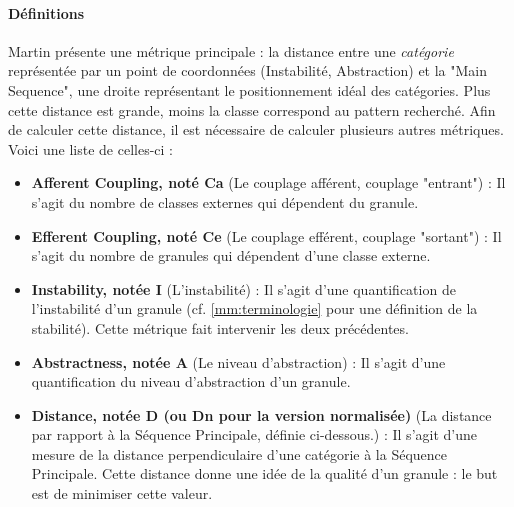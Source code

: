 \documentclass{scrartcl}
\begin{document}
    \paragraph{Définitions}Martin présente une métrique principale : la distance entre une \textit{catégorie} représentée par un point de coordonnées (Instabilité, Abstraction) et la "Main Sequence", une droite représentant le positionnement idéal des catégories. Plus cette distance est grande, moins la classe correspond au pattern recherché. Afin de calculer cette distance, il est nécessaire de calculer plusieurs autres métriques. Voici une liste de celles-ci :
    \begin{itemize}
        \item \textbf{Afferent Coupling, noté Ca} (Le couplage afférent, couplage "entrant") : Il s'agit du nombre de classes externes qui dépendent du granule.
        \item \textbf{Efferent Coupling, noté Ce} (Le couplage efférent, couplage "sortant") : Il s'agit du nombre de granules qui dépendent d'une classe externe.
        \item \textbf{Instability, notée I} (L'instabilité) : Il s'agit d'une quantification de l'instabilité d'un granule (cf. \ref{mm:terminologie} pour une définition de la stabilité). Cette métrique fait intervenir les deux précédentes.
        \item \textbf{Abstractness, notée A} (Le niveau d'abstraction) : Il s'agit d'une quantification du niveau d'abstraction d'un granule.
        \item \textbf{Distance, notée D (ou Dn pour la version normalisée)} (La distance par rapport à la Séquence Principale, définie ci-dessous.) : Il s'agit d'une mesure de la distance perpendiculaire d'une catégorie à la Séquence Principale. Cette distance donne une idée de la qualité d'un granule : le but est de minimiser cette valeur.
    \end{itemize}
\end{document}
